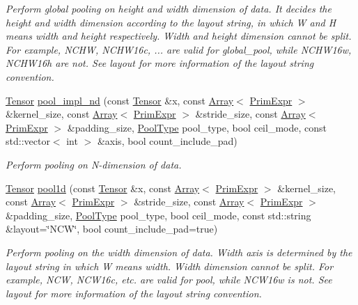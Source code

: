 \begin{DoxyCompactItemize}
\begin{DoxyCompactList}\small\item\em Perform global pooling on height and width dimension of data. It decides the height and width dimension according to the layout string, in which \textquotesingle{}W\textquotesingle{} and \textquotesingle{}H\textquotesingle{} means width and height respectively. Width and height dimension cannot be split. For example, N\+C\+HW, N\+C\+H\+W16c, ... are valid for global\+\_\+pool, while N\+C\+H\+W16w, N\+C\+H\+W16h are not. See {\itshape layout} for more information of the layout string convention. \end{DoxyCompactList}\item 
\hyperlink{classtvm_1_1te_1_1Tensor}{Tensor} \hyperlink{namespacetopi_1_1nn_a0b2681e29b1f733835ffe2e6b3b69c13}{pool\+\_\+impl\+\_\+nd} (const \hyperlink{classtvm_1_1te_1_1Tensor}{Tensor} \&x, const \hyperlink{classtvm_1_1Array}{Array}$<$ \hyperlink{classtvm_1_1PrimExpr}{Prim\+Expr} $>$ \&kernel\+\_\+size, const \hyperlink{classtvm_1_1Array}{Array}$<$ \hyperlink{classtvm_1_1PrimExpr}{Prim\+Expr} $>$ \&stride\+\_\+size, const \hyperlink{classtvm_1_1Array}{Array}$<$ \hyperlink{classtvm_1_1PrimExpr}{Prim\+Expr} $>$ \&padding\+\_\+size, \hyperlink{namespacetopi_1_1nn_ac531cfce9c3a031fa25cfb6ed1f9b95b}{Pool\+Type} pool\+\_\+type, bool ceil\+\_\+mode, const std\+::vector$<$ int $>$ \&axis, bool count\+\_\+include\+\_\+pad)
\begin{DoxyCompactList}\small\item\em Perform pooling on N-\/dimension of data. \end{DoxyCompactList}\item 
\hyperlink{classtvm_1_1te_1_1Tensor}{Tensor} \hyperlink{namespacetopi_1_1nn_a379dfcc1d33774fb4ce998550dda187c}{pool1d} (const \hyperlink{classtvm_1_1te_1_1Tensor}{Tensor} \&x, const \hyperlink{classtvm_1_1Array}{Array}$<$ \hyperlink{classtvm_1_1PrimExpr}{Prim\+Expr} $>$ \&kernel\+\_\+size, const \hyperlink{classtvm_1_1Array}{Array}$<$ \hyperlink{classtvm_1_1PrimExpr}{Prim\+Expr} $>$ \&stride\+\_\+size, const \hyperlink{classtvm_1_1Array}{Array}$<$ \hyperlink{classtvm_1_1PrimExpr}{Prim\+Expr} $>$ \&padding\+\_\+size, \hyperlink{namespacetopi_1_1nn_ac531cfce9c3a031fa25cfb6ed1f9b95b}{Pool\+Type} pool\+\_\+type, bool ceil\+\_\+mode, const std\+::string \&layout=\char`\"{}N\+CW\char`\"{}, bool count\+\_\+include\+\_\+pad=true)
\begin{DoxyCompactList}\small\item\em Perform pooling on the width dimension of data. Width axis is determined by the layout string in which \textquotesingle{}W\textquotesingle{} means width. Width dimension cannot be split. For example, N\+CW, N\+C\+W16c, etc. are valid for pool, while N\+C\+W16w is not. See {\itshape layout} for more information of the layout string convention. \end{DoxyCompactList}\item 

\end{DoxyCompactItemize}
